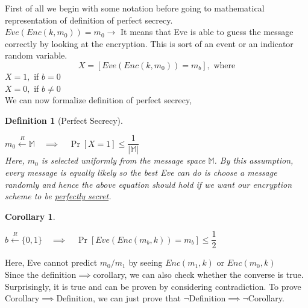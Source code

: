 \documentclass[14pt]{article}
\newtheorem{defn}{Definition}[section]
\newtheorem{coro}{Corollary}
\begin{document}
			
			\noindent
			First of all we begin with some notation before going to mathematical representation of definition of perfect secrecy.\\
			\linebreak
			$Eve(Enc(k, m_0)) = m_0 \rightarrow$ It means that Eve is able to guess the message correctly by looking at the encryption. This is sort of an event or an indicator random variable.\\
			\newpage
			$$X = [Eve(Enc(k, m_0)) = m_b], \text{ where}$$
			\linebreak
			$X = 1,$ if $b = 0$\\
			$X = 0,$ if $b \neq 0$\\
			\linebreak
			We can now formalize definition of perfect secrecy,\\
			\begin{defn}[Perfect Secrecy]
				\label{def}
				\item $m_0 \xleftarrow{R} \mathbb{M}\quad \implies \quad \Pr [X = 1] \leq \dfrac{1}{| \mathbb{M} |}$\\
				\linebreak
				Here, $m_0$ is selected uniformly from the message space $\mathbb{M}$. By this assumption, every message is equally likely so the best Eve can do is choose a message randomly and hence the above equation should hold if we want our encryption scheme to be \underline{perfectly secret}.\\
			\end{defn}
			\begin{coro}
				\label{coro}
				\item $b \xleftarrow{R} \{0, 1\} \quad \implies \quad \Pr [Eve(Enc(m_b, k)) = m_b] \leq \dfrac{1}{2}$
			\end{coro}
			\noindent
			Here, Eve cannot predict $m_0/m_1$ by seeing $Enc(m_1, k)$ or $Enc(m_0, k)$\\
			\linebreak
			Since the definition$\implies$corollary, we can also check whether the converse is true. Surprisingly, it is true and can be proven by considering contradiction. To prove Corollary$\implies$Definition, we can just prove that $\neg$Definition$\implies$$\neg$Corollary. 
			
\end{document}
